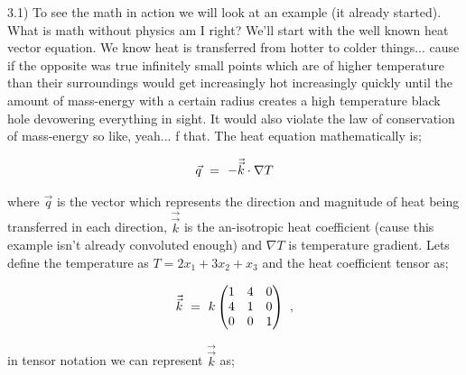 \documentclass{article}
\newcounter{subsubsubsection}[subsubsection]
\begin{document}

3.1) To see the math in action we will look at an example (it already started). What is math without physics am I right? We'll start with the well known heat vector equation. We know heat is transferred from hotter to colder things... cause if the opposite was true infinitely small points which are of higher temperature than their surroundings would get increasingly hot increasingly quickly until the amount of mass-energy with a certain radius creates a high temperature black hole devowering everything in sight. It would also violate the law of conservation of mass-energy so like, yeah... f that. The heat equation mathematically is;

\begin{equation} \label{eq:1}
\vec{q} \hspace{0.125cm} = \hspace{0.125cm} -\vec{\vec{k}} \cdot \nabla{T} 
\end{equation}

where \begin{math} \vec{q} \end{math} is the vector which represents the direction and magnitude of heat being transferred in each direction, \begin{math} \vec{\vec{k}} \end{math} is the an-isotropic heat coefficient (cause this example isn't already convoluted enough) and \begin{math} \nabla{T} \end{math} is temperature gradient. Lets define the temperature as \begin{math} T = 2 x_1 + 3 x_2 + x_3 \end{math} and the heat coefficient tensor as;

\begin{equation} \label{eq:266}
\vec{\vec{k}} \hspace{0.125cm} = \hspace{0.125cm} k \begin{pmatrix} 
1 & 4 & 0 \\
4 & 1 & 0 \\
0 & 0 & 1 \\
\end{pmatrix} \hspace{0.125cm} ,
\end{equation} 

in tensor notation we can represent \begin{math} \vec{\vec{k}} \end{math} as;
\end{document}
